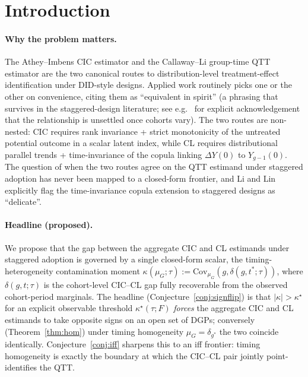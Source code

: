 \documentclass[11pt]{article}
\theoremstyle{definition}
\theoremstyle{plain}
\theoremstyle{remark}
\begin{document}
\section{Introduction}

\paragraph{Why the problem matters.} The Athey--Imbens \cite{AtheyImbens2006} CIC estimator and the Callaway--Li \cite{CallawayLi2019} group-time QTT estimator are the two canonical routes to distribution-level treatment-effect identification under DID-style designs. Applied work routinely picks one or the other on convenience, citing them as ``equivalent in spirit'' (a phrasing that survives in the staggered-design literature; see e.g.\ \cite{LiLin2024} for explicit acknowledgement that the relationship is unsettled once cohorts vary). The two routes are non-nested: CIC requires rank invariance + strict monotonicity of the untreated potential outcome in a scalar latent index, while CL requires distributional parallel trends + time-invariance of the copula linking $\Delta Y(0)$ to $Y_{g-1}(0)$. The question of when the two routes agree on the QTT estimand under staggered adoption has never been mapped to a closed-form frontier, and Li and Lin \cite{LiLin2024} explicitly flag the time-invariance copula extension to staggered designs as ``delicate''.

\paragraph{Headline (proposed).} We propose that the gap between the aggregate CIC and CL estimands under staggered adoption is governed by a single closed-form scalar, the timing-heterogeneity contamination moment $\kappa(\mu_G; \tau) := \mathrm{Cov}_{\mu_G}\!(g, \delta(g, t^*; \tau))$, where $\delta(g,t;\tau)$ is the cohort-level CIC--CL gap fully recoverable from the observed cohort-period marginals. The headline (Conjecture~\ref{conj:signflip}) is that $|\kappa| > \kappa^\star$ for an explicit observable threshold $\kappa^\star(\tau; F)$ \emph{forces} the aggregate CIC and CL estimands to take opposite signs on an open set of DGPs; conversely (Theorem~\ref{thm:hom}) under timing homogeneity $\mu_G = \delta_{g^*}$ the two coincide identically. Conjecture~\ref{conj:iff} sharpens this to an iff frontier: timing homogeneity is exactly the boundary at which the CIC--CL pair jointly point-identifies the QTT.
\end{document}
